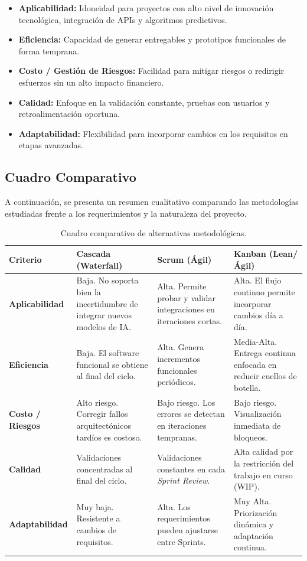 \documentclass[12pt]{article}
\begin{document}
\begin{itemize}
    \item \textbf{Aplicabilidad:} Idoneidad para proyectos con alto nivel de innovación tecnológica, integración de APIs y algoritmos predictivos.
    \item \textbf{Eficiencia:} Capacidad de generar entregables y prototipos funcionales de forma temprana.
    \item \textbf{Costo / Gestión de Riesgos:} Facilidad para mitigar riesgos o redirigir esfuerzos sin un alto impacto financiero.
    \item \textbf{Calidad:} Enfoque en la validación constante, pruebas con usuarios y retroalimentación oportuna.
    \item \textbf{Adaptabilidad:} Flexibilidad para incorporar cambios en los requisitos en etapas avanzadas.
\end{itemize}
\newpage
\subsection{Cuadro Comparativo}
A continuación, se presenta un resumen cualitativo comparando las metodologías estudiadas frente a los requerimientos y la naturaleza del proyecto.

\begin{table}[h!]
    \centering
    \renewcommand{\arraystretch}{1.5}
    \begin{tabular}{|m{2.7cm}|m{4cm}|m{4cm}|m{4cm}|}
        \hline
        \rowcolor[HTML]{EFEFEF}
        \textbf{Criterio} & \textbf{Cascada (Waterfall)} & \textbf{Scrum (Ágil)} & \textbf{Kanban (Lean/Ágil)} \\ \hline
        \textbf{Aplicabilidad} & Baja. No soporta bien la incertidumbre de integrar nuevos modelos de IA. & Alta. Permite probar y validar integraciones en iteraciones cortas. & Alta. El flujo continuo permite incorporar cambios día a día. \\ \hline
        \textbf{Eficiencia} & Baja. El software funcional se obtiene al final del ciclo. & Alta. Genera incrementos funcionales periódicos. & Media-Alta. Entrega continua enfocada en reducir cuellos de botella. \\ \hline
        \textbf{Costo / Riesgos} & Alto riesgo. Corregir fallos arquitectónicos tardíos es costoso. & Bajo riesgo. Los errores se detectan en iteraciones tempranas. & Bajo riesgo. Visualización inmediata de bloqueos. \\ \hline
        \textbf{Calidad} & Validaciones concentradas al final del ciclo. & Validaciones constantes en cada \textit{Sprint Review}. & Alta calidad por la restricción del trabajo en curso (WIP). \\ \hline
        \textbf{Adaptabilidad} & Muy baja. Resistente a cambios de requisitos. & Alta. Los requerimientos pueden ajustarse entre Sprints. & Muy Alta. Priorización dinámica y adaptación continua. \\ \hline
    \end{tabular}
    \caption{Cuadro comparativo de alternativas metodológicas.}
    \label{tab:comparativa_metodologias}
\end{table}
\newpage
\end{document}
